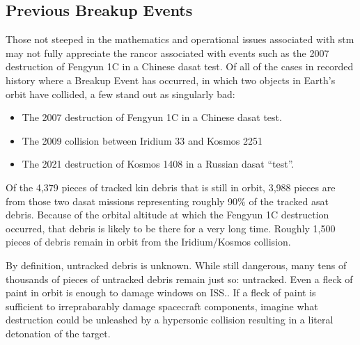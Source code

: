 \subsection{Previous Breakup Events}

Those not steeped in the mathematics and operational issues associated
with \ac{stm} may not fully appreciate the rancor associated with
events such as the 2007 destruction of Fengyun 1C in a Chinese
\ac{dasat} test.  Of all of the cases in recorded history where a
Breakup Event has occurred, in which two objects in Earth's orbit have
collided, a few stand out as singularly bad:

\begin{itemize}

\item The 2007 destruction of Fengyun 1C in a Chinese \ac{dasat} test.

\item The 2009 collision between Iridium 33 and Kosmos 2251

\item The 2021 destruction of Kosmos 1408 in a Russian \ac{dasat} ``test''.

\end{itemize}

Of the 4,379 pieces of tracked \ac{kin} debris that is still in orbit,
3,988 pieces are from those two \ac{dasat} missions representing
roughly 90\% of the tracked \ac{asat} debris.\cite[Table 5-1,
  p05-01]{brian} Because of the orbital altitude at which the Fengyun
1C destruction occurred, that debris is likely to be there for a very
long time.\cite{osa-debris} Roughly 1,500 pieces of debris remain
in orbit from the Iridium/Kosmos collision.

By definition, untracked debris is unknown.  While still dangerous,
many tens of thousands of pieces of untracked debris remain just so:
untracked.\cite[p05-01]{brian} Even a fleck of paint in orbit is
enough to damage windows on ISS.\cite[dig this one up]{xxx}.  If a
fleck of paint is sufficient to irreprabarably damage spacecraft
components, imagine what destruction could be unleashed by a
hypersonic collision resulting in a literal detonation of the
target.\cite[one of the hypersonic papers]{xxx}
